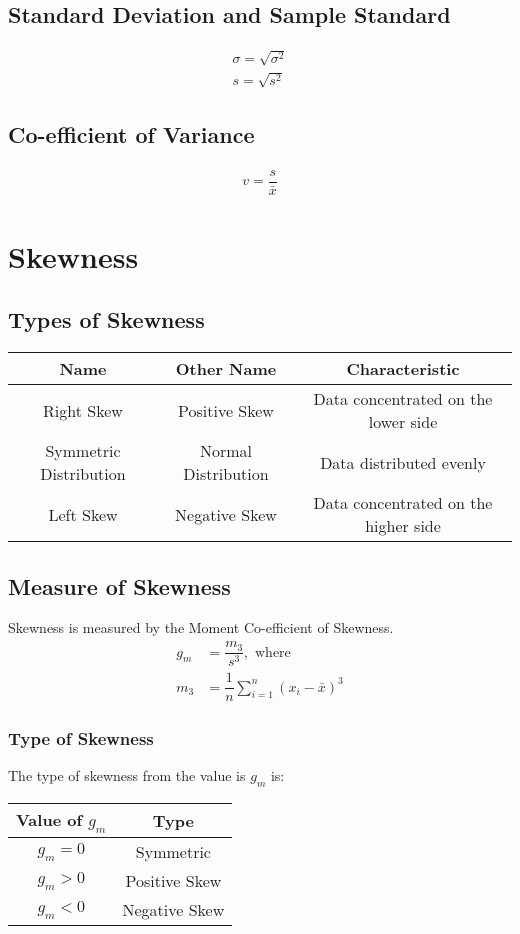 \subsection{Standard Deviation and Sample Standard}
\begin{align}
	\sigma = \sqrt{\sigma^2}\\
	s=\sqrt{s^2}
\end{align}

\subsection{Co-efficient of Variance}
\begin{align}
	v = \dfrac{s}{\bar{x}}
\end{align}

\section{Skewness}
\subsection{Types of Skewness}
\begin{table}[htbp]
	\centering
	\begin{tabular}{c c c}
		\toprule
		Name & Other Name & Characteristic\\
		\midrule
		Right Skew & Positive Skew & Data concentrated on the lower side\\
		Symmetric Distribution & Normal Distribution & Data distributed evenly\\
		Left Skew & Negative Skew & Data concentrated on the higher side\\
		\bottomrule
	\end{tabular}
\end{table}

\subsection{Measure of Skewness}
Skewness is measured by the Moment Co-efficient of Skewness.
\begin{align}
	g_m &= \dfrac{m_3}{s^3}, \text{ where}\\
	m_3 &= \dfrac{1}{n}\sum_{i=1}^{n} \left( x_i - \bar{x} \right)^3
\end{align}

\subsubsection{Type of Skewness}
The type of skewness from the value is $g_m$ is:
\begin{table}[htbp]
	\centering
	\begin{tabular}{c c}
		\toprule
		Value of $g_m$ & Type\\
		\midrule
		$g_m = 0$ & Symmetric\\
		$g_m > 0$ & Positive Skew\\
		$g_m < 0$ & Negative Skew\\
		\bottomrule
	\end{tabular}
\end{table}

